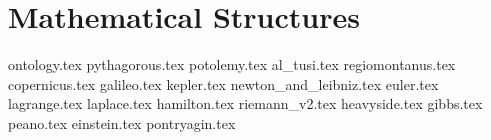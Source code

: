   \part{Mathematical Structures}

  {ontology.tex}
  {pythagorous.tex}
  {potolemy.tex}
  {al_tusi.tex}
  {regiomontanus.tex}
  {copernicus.tex}
  {galileo.tex}
  {kepler.tex}
  {newton_and_leibniz.tex}
  {euler.tex}
  {lagrange.tex}
  {laplace.tex}
  {hamilton.tex}
  {riemann_v2.tex}
  {heavyside.tex}
  {gibbs.tex}
  {peano.tex}
  {einstein.tex}
  {pontryagin.tex}